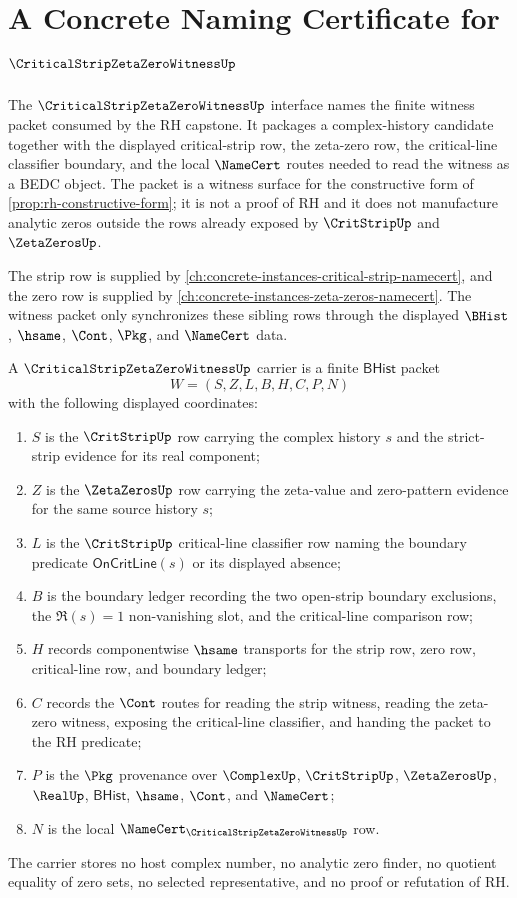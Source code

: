 \chapter{A Concrete Naming Certificate for $\CriticalStripZetaZeroWitnessUp$}
\label{ch:concrete-instances-criticalstripzetazerowitness-namecert}

The $\CriticalStripZetaZeroWitnessUp$ interface names the finite witness packet consumed by the RH capstone. It packages a complex-history candidate together with the displayed critical-strip row, the zeta-zero row, the critical-line classifier boundary, and the local $\NameCert$ routes needed to read the witness as a BEDC object. The packet is a witness surface for the constructive form of \autoref{prop:rh-constructive-form}; it is not a proof of RH and it does not manufacture analytic zeros outside the rows already exposed by $\CritStripUp$ and $\ZetaZerosUp$.

The strip row is supplied by \autoref{ch:concrete-instances-critical-strip-namecert}, and the zero row is supplied by \autoref{ch:concrete-instances-zeta-zeros-namecert}. The witness packet only synchronizes these sibling rows through the displayed $\BHist$, $\hsame$, $\Cont$, $\Pkg$, and $\NameCert$ data.

\begin{definition}
\label{def:critical-strip-zeta-zero-witness-carrier}
A $\CriticalStripZetaZeroWitnessUp$ carrier is a finite $\mathsf{BHist}$ packet
$$
W=(S,Z,L,B,H,C,P,N)
$$
with the following displayed coordinates:
\begin{enumerate}
\item $S$ is the $\CritStripUp$ row carrying the complex history $s$ and the strict-strip evidence for its real component;
\item $Z$ is the $\ZetaZerosUp$ row carrying the zeta-value and zero-pattern evidence for the same source history $s$;
\item $L$ is the $\CritStripUp$ critical-line classifier row naming the boundary predicate $\mathsf{OnCritLine}(s)$ or its displayed absence;
\item $B$ is the boundary ledger recording the two open-strip boundary exclusions, the $\Re(s)=1$ non-vanishing slot, and the critical-line comparison row;
\item $H$ records componentwise $\hsame$ transports for the strip row, zero row, critical-line row, and boundary ledger;
\item $C$ records the $\Cont$ routes for reading the strip witness, reading the zeta-zero witness, exposing the critical-line classifier, and handing the packet to the RH predicate;
\item $P$ is the $\Pkg$ provenance over $\ComplexUp$, $\CritStripUp$, $\ZetaZerosUp$, $\RealUp$, $\mathsf{BHist}$, $\hsame$, $\Cont$, and $\NameCert$;
\item $N$ is the local $\NameCert_{\CriticalStripZetaZeroWitnessUp}$ row.
\end{enumerate}
The carrier stores no host complex number, no analytic zero finder, no quotient equality of zero sets, no selected representative, and no proof or refutation of RH.
\end{definition}


